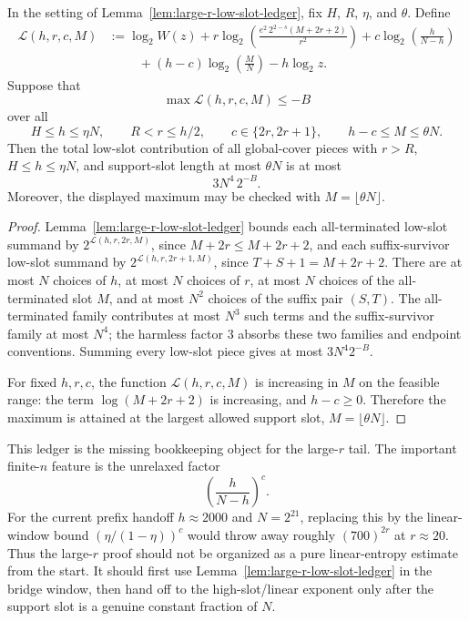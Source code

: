 \begin{lemma}
\label{lem:large-r-low-slot-certificate}
In the setting of Lemma~\ref{lem:large-r-low-slot-ledger}, fix \(H\), \(R\), \(\eta\), and \(\theta\).  Define
\[
\begin{aligned}
\mathcal{L}(h,r,c,M)
 &:=
\log_2 W(z)
+r\log_2\!\left(\frac{e^2\,2^{2-s}(M+2r+2)}{r^2}\right)
+c\log_2\!\left(\frac{h}{N-h}\right)
\\
&\hspace{1cm}
+(h-c)\log_2\!\left(\frac{M}{N}\right)
-h\log_2 z .
\end{aligned}
\]
Suppose that
\[
\max
\mathcal{L}(h,r,c,M)
\le -B
\]
over all
\[
H\le h\le \eta N,\qquad
R<r\le h/2,\qquad
c\in\{2r,2r+1\},\qquad
h-c\le M\le\theta N .
\]
Then the total low-slot contribution of all global-cover pieces with \(r>R\), \(H\le h\le\eta N\), and
support-slot length at most \(\theta N\) is at most
\[
3N^4\,2^{-B}.
\]
Moreover, the displayed maximum may be checked with \(M=\lfloor\theta N\rfloor\).
\end{lemma}

\begin{proof}
Lemma~\ref{lem:large-r-low-slot-ledger} bounds each all-terminated low-slot summand by
\(2^{\mathcal{L}(h,r,2r,M)}\), since \(M+2r\le M+2r+2\), and each suffix-survivor low-slot summand by
\(2^{\mathcal{L}(h,r,2r+1,M)}\), since \(T+S+1=M+2r+2\).  There are at most \(N\) choices of \(h\), at most \(N\)
choices of \(r\), at most \(N\) choices of the all-terminated slot \(M\), and at most \(N^2\) choices of the suffix
pair \((S,T)\).  The all-terminated family contributes at most \(N^3\) such terms and the suffix-survivor family at
most \(N^4\); the harmless factor \(3\) absorbs these two families and endpoint conventions.  Summing every low-slot
piece gives at most \(3N^4 2^{-B}\).

For fixed \(h,r,c\), the function \(\mathcal{L}(h,r,c,M)\) is increasing in \(M\) on the feasible range: the term
\(\log(M+2r+2)\) is increasing, and \(h-c\ge0\).  Therefore the maximum is attained at the largest allowed support
slot, \(M=\lfloor\theta N\rfloor\).
\end{proof}

This ledger is the missing bookkeeping object for the large-\(r\) tail.  The important finite-\(n\) feature is the
unrelaxed factor
\[
\left(\frac{h}{N-h}\right)^c.
\]
For the current prefix handoff \(h\approx2000\) and \(N=2^{21}\), replacing this by the linear-window bound
\((\eta/(1-\eta))^c\) would throw away roughly \((700)^{2r}\) at \(r\approx20\).  Thus the large-\(r\) proof should not
be organized as a pure linear-entropy estimate from the start.  It should first use
Lemma~\ref{lem:large-r-low-slot-ledger} in the bridge window, then hand off to the high-slot/linear exponent only
after the support slot is a genuine constant fraction of \(N\).


